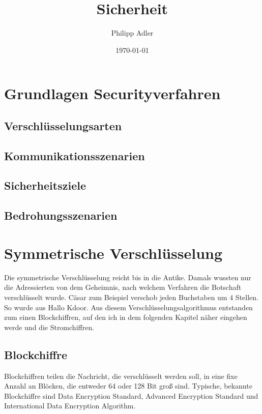 \documentclass[11pt]{scrartcl}
\title{Sicherheit}
\author{Philipp Adler}
\date{\today{}}
\begin{document}
\maketitle
\tableofcontents
\pagebreak

\section{Grundlagen Securityverfahren}
\label{sec:basics-security-process}

\subsection{Verschlüsselungsarten}
\label{sec:ciphering types}

\subsection{Kommunikationsszenarien}
\label{sec:communication-scenarios}

\subsection{Sicherheitsziele}
\label{sec:security goals}

\subsection{Bedrohungsszenarien}
\label{sec:threat scenarios}


\section{Symmetrische Verschlüsselung}
\label{sec:symetric-ciphering}
Die symmetrische Verschlüsselung reicht bis in die Antike. Damals wussten nur die Adressierten von dem Geheimnis, nach welchem Verfahren die Botschaft verschlüsselt wurde. Cäsar zum Beispiel verschob jeden Buchstaben um 4 Stellen. So wurde aus Hallo Kdoor. Aus diesem Verschlüsselungsalgorithmus entstanden zum einen Blockchiffren, auf den ich in dem folgenden Kapitel näher eingehen werde und die Stromchiffren.\cite{1}

\subsection{Blockchiffre}
\label{sec:blockchiffre}
Blockchiffren teilen die Nachricht, die verschlüsselt werden soll, in eine fixe Anzahl an Blöcken, die entweder 64 oder 128 Bit groß sind. Typische, bekannte Blockchiffre sind Data Encryption Standard, Advanced Encryption Standard und International Data Encryption Algorithm.\cite{1}
\end{document}
